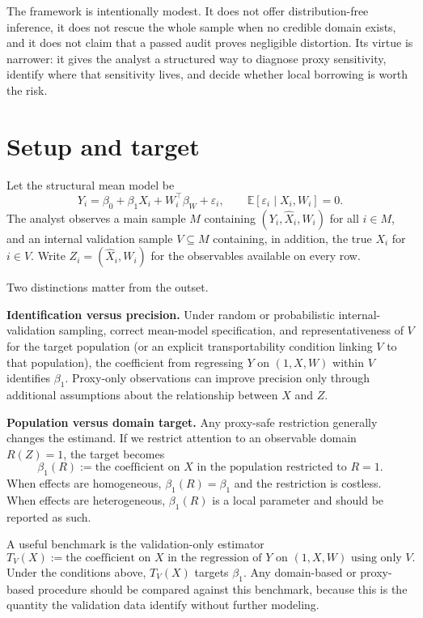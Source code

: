 \documentclass[11pt]{article}
\newcommand{\E}{\mathbb{E}}
\newcommand{\1}{\mathbf{1}}
\begin{document}
The framework is intentionally modest. It does not offer distribution-free inference, it does not rescue the whole sample when no credible domain exists, and it does not claim that a passed audit proves negligible distortion. Its virtue is narrower: it gives the analyst a structured way to diagnose proxy sensitivity, identify where that sensitivity lives, and decide whether local borrowing is worth the risk.

\section{Setup and target}

Let the structural mean model be
\begin{equation}
Y_i = \beta_0 + \beta_1 X_i + W_i^\top \beta_W + \varepsilon_i,
\qquad \E[\varepsilon_i \mid X_i,W_i]=0.
\label{eq:structural}
\end{equation}
The analyst observes a main sample $M$ containing $(Y_i,\hat X_i,W_i)$ for all $i\in M$, and an internal validation sample $V\subseteq M$ containing, in addition, the true $X_i$ for $i\in V$. Write $Z_i=(\hat X_i,W_i)$ for the observables available on every row.

Two distinctions matter from the outset.

\textbf{Identification versus precision.} Under random or probabilistic internal-validation sampling, correct mean-model specification, and representativeness of $V$ for the target population (or an explicit transportability condition linking $V$ to that population), the coefficient from regressing $Y$ on $(1,X,W)$ within $V$ identifies $\beta_1$. Proxy-only observations can improve precision only through additional assumptions about the relationship between $X$ and $Z$.

\textbf{Population versus domain target.} Any proxy-safe restriction generally changes the estimand. If we restrict attention to an observable domain $R(Z)=1$, the target becomes
\[
\beta_1(R) := \text{the coefficient on } X \text{ in the population restricted to } R=1.
\]
When effects are homogeneous, $\beta_1(R)=\beta_1$ and the restriction is costless. When effects are heterogeneous, $\beta_1(R)$ is a local parameter and should be reported as such.

A useful benchmark is the validation-only estimator
\[
T_V(X) := \text{the coefficient on } X \text{ in the regression of } Y \text{ on } (1,X,W) \text{ using only } V.
\]
Under the conditions above, $T_V(X)$ targets $\beta_1$. Any domain-based or proxy-based procedure should be compared against this benchmark, because this is the quantity the validation data identify without further modeling.
\end{document}
